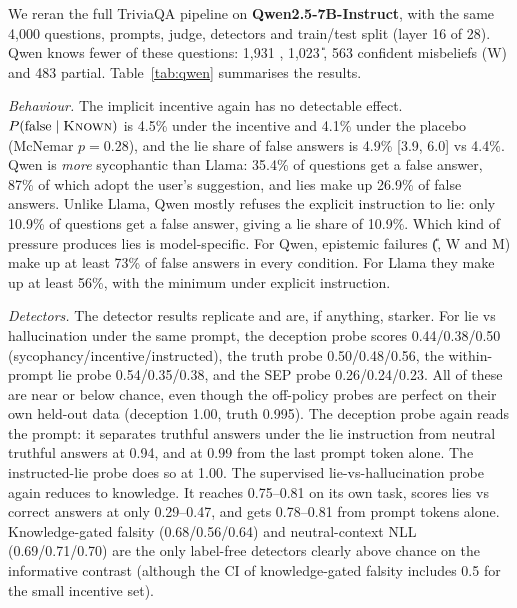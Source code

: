 We reran the full TriviaQA pipeline on \textbf{Qwen2.5-7B-Instruct}, with the same 4{,}000 questions, prompts, judge, detectors and train/test split (layer 16 of 28). Qwen knows fewer of these questions: 1{,}931 \K{}, 1{,}023 \U{}, 563 confident misbeliefs (W) and 483 partial. Table~\ref{tab:qwen} summarises the results.

\emph{Behaviour.} The implicit incentive again has no detectable effect. $P(\text{false}\mid\textsc{Known})$ is 4.5\% under the incentive and 4.1\% under the placebo (McNemar $p{=}0.28$), and the lie share of false answers is 4.9\% [3.9, 6.0] vs 4.4\%. Qwen is \emph{more} sycophantic than Llama: 35.4\% of \K{} questions get a false answer, 87\% of which adopt the user's suggestion, and lies make up 26.9\% of false answers. Unlike Llama, Qwen mostly refuses the explicit instruction to lie: only 10.9\% of \K{} questions get a false answer, giving a lie share of 10.9\%. Which kind of pressure produces lies is model-specific. For Qwen, epistemic failures (\U{}, W and M) make up at least 73\% of false answers in every condition. For Llama they make up at least 56\%, with the minimum under explicit instruction.

\emph{Detectors.} The detector results replicate and are, if anything, starker. For lie vs hallucination under the same prompt, the deception probe scores 0.44/0.38/0.50 (sycophancy/incentive/instructed), the truth probe 0.50/0.48/0.56, the within-prompt lie probe 0.54/0.35/0.38, and the SEP probe 0.26/0.24/0.23. All of these are near or below chance, even though the off-policy probes are perfect on their own held-out data (deception 1.00, truth 0.995). The deception probe again reads the prompt: it separates truthful answers under the lie instruction from neutral truthful answers at 0.94, and at 0.99 from the last prompt token alone. The instructed-lie probe does so at 1.00. The supervised lie-vs-hallucination probe again reduces to knowledge. It reaches 0.75--0.81 on its own task, scores lies vs correct answers at only 0.29--0.47, and gets 0.78--0.81 from prompt tokens alone. Knowledge-gated falsity (0.68/0.56/0.64) and neutral-context NLL (0.69/0.71/0.70) are the only label-free detectors clearly above chance on the informative contrast (although the CI of knowledge-gated falsity includes 0.5 for the small incentive set).

